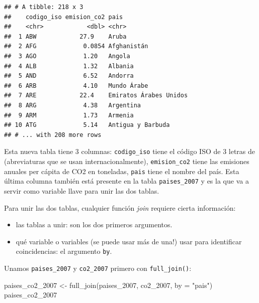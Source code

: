 \documentclass[
  openany]{book}
\newenvironment{Shaded}{\begin{snugshade}}{\end{snugshade}}
\newcommand{\AttributeTok}[1]{\textcolor[rgb]{0.77,0.63,0.00}{#1}}
\newcommand{\FunctionTok}[1]{\textcolor[rgb]{0.00,0.00,0.00}{#1}}
\newcommand{\NormalTok}[1]{#1}
\newcommand{\OtherTok}[1]{\textcolor[rgb]{0.56,0.35,0.01}{#1}}
\newcommand{\StringTok}[1]{\textcolor[rgb]{0.31,0.60,0.02}{#1}}
\providecommand{\tightlist}{%
  \setlength{\itemsep}{0pt}\setlength{\parskip}{0pt}}
\begin{document}
\begin{verbatim}
## # A tibble: 218 x 3
##    codigo_iso emision_co2 pais                  
##    <chr>            <dbl> <chr>                 
##  1 ABW            27.9    Aruba                 
##  2 AFG             0.0854 Afghanistán           
##  3 AGO             1.20   Angola                
##  4 ALB             1.32   Albania               
##  5 AND             6.52   Andorra               
##  6 ARB             4.10   Mundo Árabe           
##  7 ARE            22.4    Emiratos Árabes Unidos
##  8 ARG             4.38   Argentina             
##  9 ARM             1.73   Armenia               
## 10 ATG             5.14   Antigua y Barbuda     
## # ... with 208 more rows
\end{verbatim}

Esta nueva tabla tiene 3 columnas: \texttt{codigo\_iso} tiene el código ISO de 3 letras de (abreviaturas que se usan internacionalmente), \texttt{emision\_co2} tiene las emisiones anuales per cápita de CO2 en toneladas, \texttt{pais} tiene el nombre del país.
Esta última columna también está presente en la tabla \texttt{paises\_2007} y es la que va a servir como variable llave para unir las dos tablas.

Para unir las dos tablas, cualquier función \emph{join} requiere cierta información:

\begin{itemize}
\tightlist
\item
  las tablas a unir: son los dos primeros argumentos.
\item
  qué variable o variables (se puede usar más de una!) usar para identificar coincidencias: el argumento \texttt{by}.
\end{itemize}

Unamos \texttt{paises\_2007} y \texttt{co2\_2007} primero con \texttt{full\_join()}:

\begin{Shaded}
\begin{Highlighting}[]
\NormalTok{paises\_co2\_2007 }\OtherTok{\textless{}{-}} \FunctionTok{full\_join}\NormalTok{(paises\_2007, co2\_2007, }\AttributeTok{by =} \StringTok{"pais"}\NormalTok{)}
\NormalTok{paises\_co2\_2007}
\end{Highlighting}
\end{Shaded}
\end{document}
